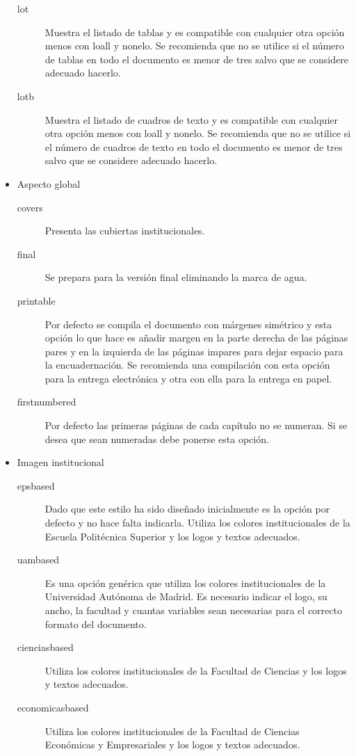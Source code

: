 \begin{itemize}
\begin{description}
    \item [lot] Muestra el listado de tablas y es compatible con cualquier otra opción menos con loall y nonelo. Se recomienda que no se utilice si el número de tablas en todo el documento es menor de tres salvo que se considere adecuado hacerlo.
    \item [lotb] Muestra el listado de cuadros de texto y es compatible con cualquier otra opción menos con loall y nonelo. Se recomienda que no se utilice si el número de cuadros de texto en todo el documento es menor de tres salvo que se considere adecuado hacerlo.
  \end{description}
  \item Aspecto global
  \begin{description}
    \item [covers] Presenta las cubiertas institucionales.
    \item [final] Se prepara para la versión final eliminando la marca de agua.
    \item [printable] Por defecto se compila el documento con márgenes simétrico y esta opción lo que hace es añadir margen en la parte derecha de las páginas pares y en la izquierda de las páginas impares para dejar espacio para la encuadernación. Se recomienda una compilación con esta opción para la entrega electrónica y otra con ella para la entrega en papel.
    \item [firstnumbered] Por defecto las primeras páginas de cada capítulo no se numeran. Si se desea que sean numeradas debe ponerse esta opción.
  \end{description}
  \item Imagen institucional
  \begin{description}
    \item [epsbased] Dado que este estilo ha sido diseñado inicialmente es la opción por defecto y no hace falta indicarla. Utiliza los colores institucionales de la Escuela Politécnica Superior y los logos y textos adecuados.
    \item [uambased] Es una opción genérica que utiliza los colores institucionales de la Universidad Autónoma de Madrid. Es necesario indicar el logo, su ancho, la facultad y cuantas variables sean necesarias para el correcto formato del documento.
    \item [cienciasbased] Utiliza los colores institucionales de la Facultad de Ciencias y los logos y textos adecuados.
    \item [economicasbased] Utiliza los colores institucionales de la Facultad de Ciencias Económicas y Empresariales y los logos y textos adecuados.

\end{description}
\end{itemize}
